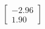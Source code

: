 \documentclass[preview]{standalone}
\begin{document}
\begin{align*}
\begin{bmatrix} -2.96 \\ 1.90 \end{bmatrix}
\end{align*}
\end{document}
